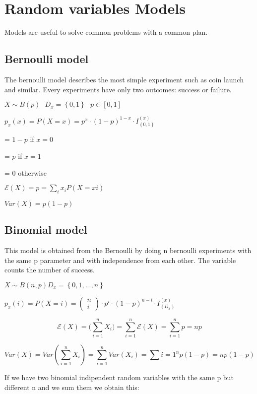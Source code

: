 \documentclass{article}
\begin{document}
\section{Random variables Models}

Models are useful to solve common problems with a common plan.

\subsection{Bernoulli model}

The bernoulli model describes the most simple experiment such as coin launch and similar. Every experiments have only two outcomes: success or failure.
\bigskip

$X \sim B(p) \ \ \ D_x = \left\{0,1\right\} \ \ \ p \in [0,1]$
\bigskip

$p_x(x) = P(X=x) = p^x \cdot(1-p)^{1-x} \cdot I_\left\{0,1\right\}^{(x)}$

= $1-p$ if $x = 0$ 

= $p$ if $x = 1$

= 0 otherwise
\bigskip

$\mathcal E(X) = p = \sum_{i}x_i P(X=xi)$

$Var(X)=p(1-p)$

\subsection{Binomial model}

This model is obtained from the Bernoulli by doing n bernoulli experiments with the same p parameter and with independence from each other. The variable counts the number of success.

$X \sim B(n,p) D_x = \left\{0,1,...,n\right\}$
\bigskip

$p_x(i) = P(X=i) = \left(\begin{array}{c} n \\ i \end{array} \right) \cdot p^i \cdot (1-p)^{n-i}\cdot I_\left\{D_x\right\}^{(x)}$
\bigskip

$$\mathcal E(X) = \mathcal(\sum_{i=1}^n X_i) = \sum_{i=1}^n \mathcal E(X) = \sum_{i=1}^n p = np$$

$$Var(X) = Var(\sum_{i=1}^n X_i) = \sum_{i=1}^nVar(X_i) = \sum{i=1}^np(1-p) = np(1-p)$$
\bigskip

If we have two binomial indipendent random variables with the same p but different n and we sum them we obtain this:
\end{document}
